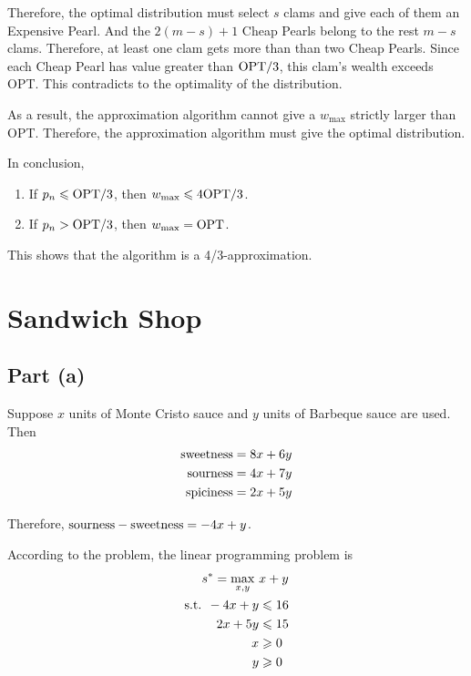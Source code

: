 \documentclass{article}
\begin{document}
Therefore, the optimal distribution must select $s$ clams and give each of them an Expensive Pearl. And the $2(m-s)+1$ Cheap Pearls belong to the rest $m-s$ clams. Therefore, at least one clam gets more than than two Cheap Pearls. Since each Cheap Pearl has value greater than $\textup{OPT}/3$, this clam's wealth exceeds OPT. This contradicts to the optimality of the distribution.

As a result, the approximation algorithm cannot give a $w_{\max}$ strictly larger than OPT. Therefore, the approximation algorithm must give the optimal distribution.


In conclusion,
\begin{enumerate}
\item{If $p_n\leqslant\textup{OPT}/3$, then $w_{\max}\leqslant4\textup{OPT}/3$.}
\item{If $p_n>\textup{OPT}/3$, then $w_{\max}=\textup{OPT}$.}
\end{enumerate}

This shows that the algorithm is a 4/3-approximation.

\section{Sandwich Shop}
\subsection{Part (a)}
Suppose $x$ units of Monte Cristo sauce and $y$ units of Barbeque sauce are used. Then
\begin{align*}
\textup{sweetness}=8x+6y\\
\textup{sourness}=4x+7y\\
\textup{spiciness}=2x+5y
\end{align*}

Therefore, $\textup{sourness}-\textup{sweetness}=-4x+y$.

According to the problem, the linear programming problem is
\begin{align*}
s^*=\max_{x,y}~&x+y\\
\textup{s.t. }-4x+y&\leqslant16\\
2x+5y&\leqslant15\\
x&\geqslant0\\
y&\geqslant0
\end{align*}
\end{document}
